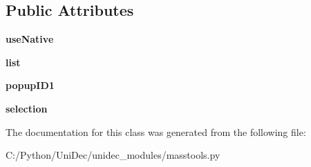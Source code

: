 \subsection*{Public Attributes}
\begin{DoxyCompactItemize}
\item 
\hypertarget{class_uni_dec_1_1unidec__modules_1_1masstools_1_1_test_list_ctrl_panel3_a08cca695b8ac969c8782fa1c48bea2b0}{}{\bfseries use\+Native}\label{class_uni_dec_1_1unidec__modules_1_1masstools_1_1_test_list_ctrl_panel3_a08cca695b8ac969c8782fa1c48bea2b0}

\item 
\hypertarget{class_uni_dec_1_1unidec__modules_1_1masstools_1_1_test_list_ctrl_panel3_a7ee8ea1d1884604d99523e6516ae6a7a}{}{\bfseries list}\label{class_uni_dec_1_1unidec__modules_1_1masstools_1_1_test_list_ctrl_panel3_a7ee8ea1d1884604d99523e6516ae6a7a}

\item 
\hypertarget{class_uni_dec_1_1unidec__modules_1_1masstools_1_1_test_list_ctrl_panel3_a61028927b4a4b3ed61a623340d79afe5}{}{\bfseries popup\+I\+D1}\label{class_uni_dec_1_1unidec__modules_1_1masstools_1_1_test_list_ctrl_panel3_a61028927b4a4b3ed61a623340d79afe5}

\item 
\hypertarget{class_uni_dec_1_1unidec__modules_1_1masstools_1_1_test_list_ctrl_panel3_a795c49c8e521fdf9ec039a63b3d4dd4f}{}{\bfseries selection}\label{class_uni_dec_1_1unidec__modules_1_1masstools_1_1_test_list_ctrl_panel3_a795c49c8e521fdf9ec039a63b3d4dd4f}

\end{DoxyCompactItemize}


The documentation for this class was generated from the following file\+:\begin{DoxyCompactItemize}
\item 
C\+:/\+Python/\+Uni\+Dec/unidec\+\_\+modules/masstools.\+py\end{DoxyCompactItemize}
